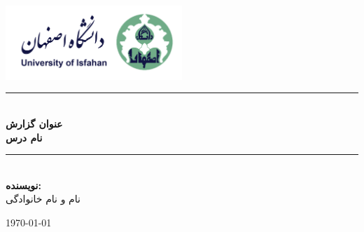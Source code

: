 \begin{titlepage}
	\nas
	\setlength{\arrayrulewidth}{0.4mm}
	\newcommand{\HRule}{\rule{\linewidth}{0.5mm}}
	\begin{center}
		\includegraphics[width=0.5\textwidth]{./Fig/logo.png}~\\[4cm]
		
		\HRule \\[0.4cm]
		{
			\huge\textbf{عنوان گزارش} \\
			[0.4cm]
			
			\large \bfseries
			نام درس \\ 
			[0.4cm]}
		\HRule \\[4cm]
		
		\large\textbf{نویسنده: }\\[0.2cm]
		نام و نام خانوادگی 
		\\[2cm]
		
		\vfill
		
		{\small \nas  \today}
		
	\end{center}
\end{titlepage}